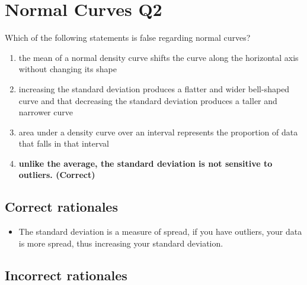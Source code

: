 \documentclass[letterpaper,9pt,twoside,printwatermark=false]{pinp}
\providecommand{\tightlist}{%
  \setlength{\itemsep}{0pt}\setlength{\parskip}{0pt}}
\begin{document}
\section{Normal Curves Q2}\label{normal-curves-q2}

Which of the following statements is false regarding normal curves?

\begin{enumerate}
\def\labelenumi{\alph{enumi})}
\tightlist
\item
  the mean of a normal density curve shifts the curve along the
  horizontal axis without changing its shape
\item
  increasing the standard deviation produces a flatter and wider
  bell-shaped curve and that decreasing the standard deviation produces
  a taller and narrower curve
\item
  area under a density curve over an interval represents the proportion
  of data that falls in that interval
\item
  \textbf{unlike the average, the standard deviation is not sensitive to
  outliers. (Correct)}
\end{enumerate}

\subsection{Correct rationales}\label{correct-rationales-6}

\begin{itemize}
\tightlist
\item
  The standard deviation is a measure of spread, if you have outliers,
  your data is more spread, thus increasing your standard deviation.
\end{itemize}

\subsection{Incorrect rationales}\label{incorrect-rationales-6}





\end{document}
